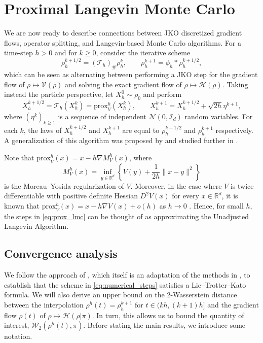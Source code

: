 \documentclass[final,12pt]{colt2018}
\newcommand{\was}{\mathcal{W}}
\newcommand{\prox}{\text{prox}}
\begin{document}
\section{Proximal Langevin Monte Carlo}
We are now ready to describe connections between JKO discretized gradient flows, operator splitting, and Langevin-based Monte Carlo algorithms. For a time-step $h>0$ and for $k\geq 0$, consider the iterative scheme
\begin{equation}\label{eq:numerical_steps}
\rho_h^{k+1/2} = (\mathcal{T}_h)_\# \rho_h^{k}, \quad \quad \rho_h^{k+1} = \phi_h * \rho_h^{k+1/2},
\end{equation}
which can be seen as alternating between performing a JKO step for the gradient flow of $\rho \mapsto \mathcal{V}(\rho)$ and solving the exact gradient flow of $\rho \mapsto \mathcal{H}(\rho)$. Taking instead the particle perspective,  let $X_h^{0} \sim \rho_0$ and perform
\begin{equation}\label{eq:prox_lmc}
X_h^{k+1/2} = \mathcal{T}_h(X_h^{k}) = \prox_V^h(X_h^{k}), \quad \quad X_h^{k+1} = X_h^{k+1/2} + \sqrt{2h}\eta^{k+1},
\end{equation} 
where $(\eta^{k})_{k\geq 1}$ is a sequence of independent $\mathcal{N}(0,\mathcal{I}_d)$ random variables. For each $k$, the laws of $X_h^{k+1/2}$ and $X_h^{k+1}$ are equal to $\rho_h^{k+1/2}$ and  $\rho_h^{k+1}$ respectively. A generalization of this algorithm was proposed by \citet{pereyra2016proximal} and studied further in \citet{durmus2016efficient}.

Note that $\prox_V^h(x) = x - h \nabla M_V^h(x)$, where 
\begin{equation}
M_V^h(x) = \inf_{y \in \mathbb{R}^d}\left\{V(y) + \frac{1}{2h}\|x - y\|^2\right\}
\end{equation}
is the Moreau--Yosida regularization of $V$. Moreover, in the case where $V$ is twice differentiable with positive definite Hessian $D^2V(x)$ for every $x\in\mathbb{R}^d$, it is known that $\prox_V^h(x) = x - h\nabla V(x) + o(h)$ as $h\to 0$ \citep[see e.g.][Section 3.3]{parikh2014proximal}. Hence, for small $h$, the steps in \eqref{eq:prox_lmc} can be thought of as approximating the Unadjusted Langevin Algorithm.

\subsection{Convergence analysis}
We follow the approach of \citet{clement2011trotter}, which itself is an adaptation of the methods in \citet[Chapter 4]{ambrosio2005}, to establish that the scheme in \eqref{eq:numerical_steps} satisfies a Lie--Trotter--Kato formula. We will also derive an upper bound on the 2-Wasserstein distance between the interpolation $\rho^h(t) = \rho_h^{k+1}$ for $t \in (kh, (k+1)h]$ and the gradient flow $\rho(t)$ of $\rho \mapsto \mathcal{H}(\rho | \pi)$. In turn, this allows us to bound the quantity of interest, $\was_2(\rho^h(t),\pi)$. Before stating the main results, we introduce some notation.
\end{document}
